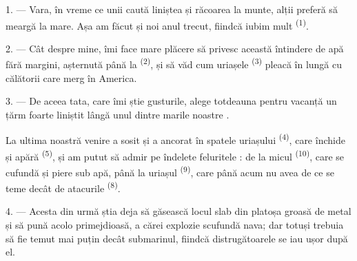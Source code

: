 %
%

\VUsaut{4.0mm}
\VUsaut{3.0mm}
\VUsaut{3.0mm}

1. --- Vara, în vreme ce unii caută liniștea și răcoarea la munte, alții preferă să
meargă la mare. Așa am făcut și noi anul trecut, fiindcă iubim mult
 \textsuperscript{(1)}.

2. --- Cât despre mine, îmi face mare plăcere să privesc această întindere de apă
fără margini, așternută până la  \textsuperscript{(2)}, și să văd cum
uriașele  \textsuperscript{(3)} pleacă în  lungă cu
călătorii care merg în America.

3. --- De aceea tata, care îmi știe gusturile, alege totdeauna pentru vacanță un
țărm foarte liniștit lângă unul dintre marile noastre .

La ultima noastră venire  a sosit și a ancorat în spatele uriașului
 \textsuperscript{(4)}, care închide și apără 
\textsuperscript{(5)}, și am putut să admir pe îndelete feluritele : de la micul  \textsuperscript{(10)}, care se cufundă și
piere sub apă, până la uriașul  \textsuperscript{(9)}, care până
acum nu avea de ce se teme decât de atacurile 
\textsuperscript{(8)}.

\VUsaut{3.0mm}
\VUsaut{3.0mm}

4. --- Acesta din urmă știa deja să găsească  locul slab din
platoșa groasă de metal și să pună acolo  primejdioasă, a cărei
explozie scufundă nava; dar totuși trebuia să fie temut mai puțin decât submarinul,
fiindcă distrugătoarele se iau ușor după el.

